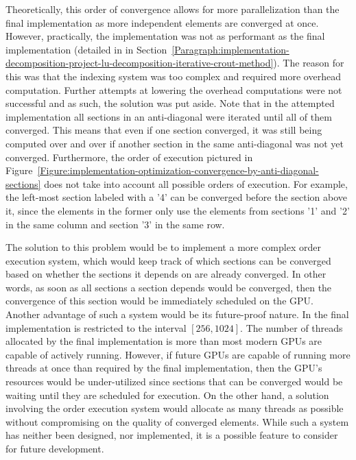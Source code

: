 Theoretically, this order of convergence allows for more parallelization than the final implementation as more independent elements are converged at once. However, practically, the implementation was not as performant as the final implementation (detailed in \textit{} in Section~\ref{Paragraph:implementation-decomposition-project-lu-decomposition-iterative-crout-method}). The reason for this was that the indexing system was too complex and required more overhead computation. Further attempts at lowering the overhead computations were not successful and as such, the solution was put aside. Note that in the attempted implementation all sections in an anti-diagonal were iterated until all of them converged. This means that even if one section converged, it was still being computed over and over if another section in the same anti-diagonal was not yet converged. Furthermore, the order of execution pictured in Figure~\ref{Figure:implementation-optimization-convergence-by-anti-diagonal-sections} does not take into account all possible orders of execution. For example, the left-most section labeled with a '4' can be converged before the section above it, since the elements in the former only use the elements from sections '1' and '2' in the same column and section '3' in the same row.
\par The solution to this problem would be to implement a more complex order execution system, which would keep track of which sections can be converged based on whether the sections it depends on are already converged. In other words, as soon as all sections a section depends would be converged, then the convergence of this section would be immediately scheduled on the GPU. \\
Another advantage of such a system would be its future-proof nature. In the final implementation  is restricted to the interval $ \left[256, 1024\right] $. The number of threads allocated by the final implementation is more than most modern GPUs are capable of actively running. However, if future GPUs are capable of running more threads at once than required by the final implementation, then the GPU's resources would be under-utilized since sections that can be converged would be waiting until they are scheduled for execution. On the other hand, a solution involving the order execution system would allocate as many threads as possible without compromising on the quality of converged elements. While such a system has neither been designed, nor implemented, it is a possible feature to consider for future development.